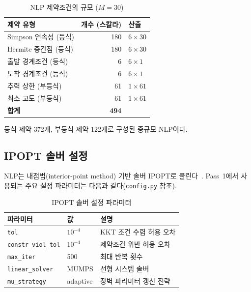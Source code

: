 \documentclass[11pt]{article}
\begin{document}
\begin{table}[htbp]
\centering
\caption{NLP 제약조건의 규모 ($M = 30$)}
\label{tab:constraints}
\begin{tabular}{@{}lrl@{}}
\toprule
제약 유형 & 개수 (스칼라) & 산출 \\
\midrule
Simpson 연속성 (등식) & 180 & $6 \times 30$ \\
Hermite 중간점 (등식) & 180 & $6 \times 30$ \\
출발 경계조건 (등식) & 6 & $6 \times 1$ \\
도착 경계조건 (등식) & 6 & $6 \times 1$ \\
추력 상한 (부등식) & 61 & $1 \times 61$ \\
최소 고도 (부등식) & 61 & $1 \times 61$ \\
\midrule
\textbf{합계} & \textbf{494} & \\
\bottomrule
\end{tabular}
\end{table}

등식 제약 372개, 부등식 제약 122개로 구성된 중규모 NLP이다.


\subsection{IPOPT 솔버 설정}
\label{sec:ipopt}

NLP는 내점법(interior-point method) 기반 솔버 IPOPT로 풀린다~\cite{Wachter2006}. Pass~1에서 사용되는 주요 설정 파라미터는 다음과 같다(\texttt{config.py} 참조).

\begin{table}[htbp]
\centering
\caption{IPOPT 솔버 설정 파라미터}
\label{tab:ipopt}
\begin{tabular}{@{}lll@{}}
\toprule
파라미터 & 값 & 설명 \\
\midrule
\texttt{tol} & $10^{-4}$ & KKT 조건 수렴 허용 오차 \\
\texttt{constr\_viol\_tol} & $10^{-4}$ & 제약조건 위반 허용 오차 \\
\texttt{max\_iter} & 500 & 최대 반복 횟수 \\
\texttt{linear\_solver} & MUMPS & 선형 시스템 솔버 \\
\texttt{mu\_strategy} & adaptive & 장벽 파라미터 갱신 전략 \\
\bottomrule
\end{tabular}
\end{table}
\end{document}
